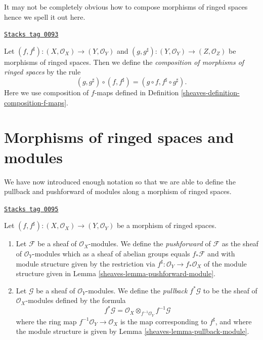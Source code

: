 It may not be completely obvious how to compose morphisms of
ringed spaces hence we spell it out here.

\begin{definition}
\label{sheaves-definition-composition-maps-ringed-spaces}
\href{https://stacks.math.columbia.edu/tag/0093}{\texttt{Stacks tag 0093}}

Let
$(f, f^\sharp) : (X, \mathcal{O}_X) \to (Y, \mathcal{O}_Y)$ and
$(g, g^\sharp) : (Y, \mathcal{O}_Y) \to (Z, \mathcal{O}_Z)$
be morphisms of ringed spaces. Then we define
the {\it composition of morphisms of ringed spaces}
by the rule
$$
(g, g^\sharp) \circ (f, f^\sharp) = (g \circ f, f^\sharp \circ g^\sharp).
$$
Here we use composition of $f$-maps defined in
Definition \ref{sheaves-definition-composition-f-maps}.
\end{definition}

\section{Morphisms of ringed spaces and modules}
\label{sheaves-section-ringed-spaces-functoriality-modules}
We have now introduced enough notation so that we are able to
define the pullback and pushforward of modules along a morphism
of ringed spaces.

\begin{definition}[Pushforward]
\label{sheaves-definition-pushforward}
\href{https://stacks.math.columbia.edu/tag/0095}{\texttt{Stacks tag 0095}}

Let $(f, f^\sharp) : (X, \mathcal{O}_X) \to (Y, \mathcal{O}_Y)$
be a morphism of ringed spaces.
\begin{enumerate}
\item Let $\mathcal{F}$ be a sheaf of $\mathcal{O}_X$-modules.
We define the {\it pushforward} of $\mathcal{F}$ as the
sheaf of $\mathcal{O}_Y$-modules which as a sheaf
of abelian groups equals $f_*\mathcal{F}$ and with
module structure given by the restriction
via $f^\sharp : \mathcal{O}_Y \to f_*\mathcal{O}_X$
of the module structure given
in Lemma \ref{sheaves-lemma-pushforward-module}.
\item Let $\mathcal{G}$ be a sheaf of $\mathcal{O}_Y$-modules.
We define the {\it pullback} $f^*\mathcal{G}$ to be the
sheaf of $\mathcal{O}_X$-modules defined by the formula
$$
f^*\mathcal{G}
=
\mathcal{O}_X \otimes_{f^{-1}\mathcal{O}_Y} f^{-1}\mathcal{G}
$$
where the ring map $f^{-1}\mathcal{O}_Y \to \mathcal{O}_X$
is the map corresponding to $f^\sharp$, and where the  module
structure is given by Lemma \ref{sheaves-lemma-pullback-module}.
\end{enumerate}
\end{definition}

